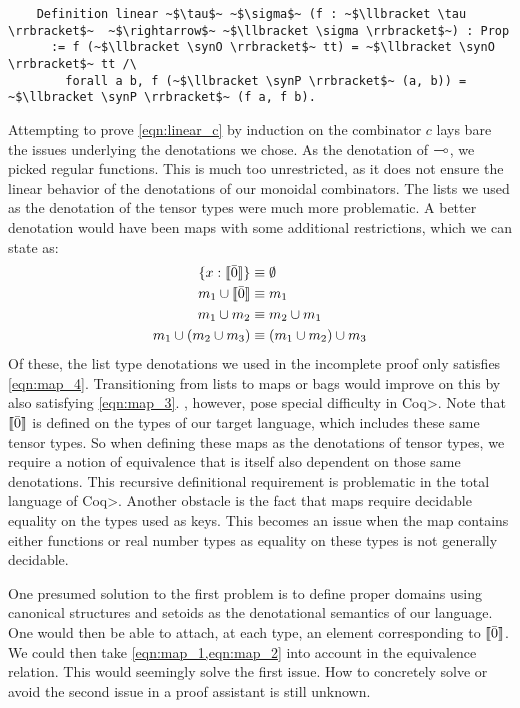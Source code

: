   \begin{verbatim}
    Definition linear ~$\tau$~ ~$\sigma$~ (f : ~$\llbracket \tau \rrbracket$~  ~$\rightarrow$~ ~$\llbracket \sigma \rrbracket$~) : Prop
      := f (~$\llbracket \synO \rrbracket$~ tt) = ~$\llbracket \synO \rrbracket$~ tt /\
        forall a b, f (~$\llbracket \synP \rrbracket$~ (a, b)) = ~$\llbracket \synP \rrbracket$~ (f a, f b).
  \end{verbatim}

  Attempting to prove \cref{eqn:linear_c} by induction on the combinator $c$ lays bare the issues underlying the denotations we chose.
  As the denotation of $\multimap$, we picked regular functions.
  This is much too unrestricted, as it does not ensure the linear behavior of the denotations of our monoidal combinators.
  The lists we used as the denotation of the tensor types were much more problematic.
  A better denotation would have been maps with some additional restrictions, which we can state as:
  \begin{align}
    \{ x : \llbracket \bar{0} \rrbracket \} &\equiv \emptyset \label{eqn:map_1}\\
    m_1 \cup \llbracket \bar{0} \rrbracket &\equiv m_1 \label{eqn:map_2}\\
    m_1 \cup m_2 &\equiv m_2 \cup m_1 \label{eqn:map_3}\\
    m_1 \cup (m_2 \cup m_3) &\equiv (m_1 \cup m_2) \cup m_3 \label{eqn:map_4}
  \end{align}
  Of these, the list type denotations we used in the incomplete proof only satisfies \cref{eqn:map_4}.
  Transitioning from lists to maps or bags would improve on this by also satisfying \cref{eqn:map_3}.
  \Cref{eqn:map_1,eqn:map_2}, however, pose special difficulty in \<Coq>.
  Note that $\llbracket \bar{0} \rrbracket$ is defined on the types of our target language, which includes these same tensor types.
  So when defining these maps as the denotations of tensor types, we require a notion of equivalence that is itself also dependent on those same denotations.
  This recursive definitional requirement is problematic in the total language of \<Coq>.
  Another obstacle is the fact that maps require decidable equality on the types used as keys.
  This becomes an issue when the map contains either functions or real number types as equality on these types is not generally decidable.

  One presumed solution to the first problem is to define proper domains using canonical structures and setoids as the denotational semantics of our language.
  One would then be able to attach, at each type, an element corresponding to $\llbracket \bar{0} \rrbracket$.
  We could then take \cref{eqn:map_1,eqn:map_2} into account in the equivalence relation.
  This would seemingly solve the first issue.
  How to concretely solve or avoid the second issue in a proof assistant is still unknown.
